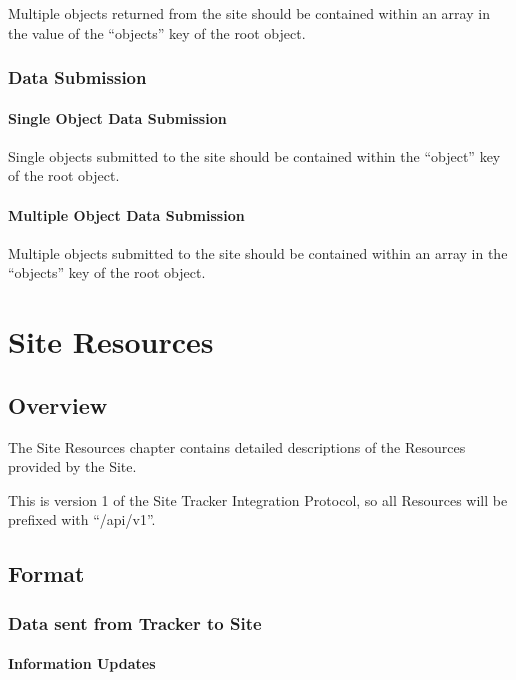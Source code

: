 \documentclass[10pt,letterpaper,titlepage]{report}
\begin{document}
Multiple objects returned from the site should be contained within an array in the value of the ``objects'' key of the root object.

\subsection{Data Submission}

\subsubsection{Single Object Data Submission}

Single objects submitted to the site should be contained within the ``object'' key of the root object.

\subsubsection{Multiple Object Data Submission}

Multiple objects submitted to the site should be contained within an array in the ``objects'' key of the root object.

\chapter{Site Resources}

\section{Overview}

The Site Resources chapter contains detailed descriptions of the Resources provided by the Site.

This is version 1 of the Site Tracker Integration Protocol, so all Resources will be prefixed with ``/api/v1''.

\section{Format}

\subsection{Data sent from Tracker to Site}

\subsubsection{Information Updates}
\end{document}
